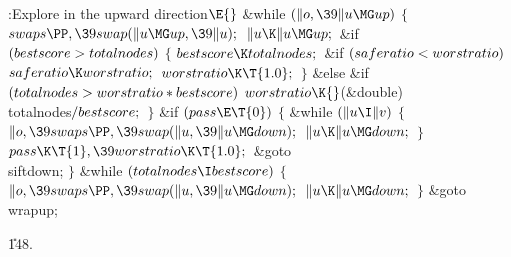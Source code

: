 \Y\B\4:Explore in the upward direction\X${}\E{}$\6
\&{while} ${}(\|o,\39\|u\MG\\{up}){}$\5
${}\{{}$\1\6
${}\\{swaps}\PP,\39\\{swap}(\|u\MG\\{up},\39\|u);{}$\6
${}\|u\K\|u\MG\\{up};{}$\6
\&{if} ${}(\\{bestscore}>\\{totalnodes}){}$\5
${}\{{}$\1\6
${}\\{bestscore}\K\\{totalnodes};{}$\6
\&{if} ${}(\\{saferatio}<\\{worstratio}){}$\1\5
${}\\{saferatio}\K\\{worstratio};{}$\2\6
${}\\{worstratio}\K\T{1.0};{}$\6
\4${}\}{}$\5
\2\&{else} \&{if} ${}(\\{totalnodes}>\\{worstratio}*\\{bestscore}){}$\1\5
${}\\{worstratio}\K{}$(\&{double}) \\{totalnodes}${}/\\{bestscore};{}$\2\6
\4${}\}{}$\2\6
\&{if} ${}(\\{pass}\E\T{0}){}$\5
${}\{{}$\1\6
\&{while} ${}(\|u\I\|v){}$\5
${}\{{}$\1\6
${}\|o,\39\\{swaps}\PP,\39\\{swap}(\|u,\39\|u\MG\\{down});{}$\6
${}\|u\K\|u\MG\\{down};{}$\6
\4${}\}{}$\2\6
${}\\{pass}\K\T{1},\39\\{worstratio}\K\T{1.0};{}$\6
\&{goto} \\{siftdown};\6
\4${}\}{}$\2\6
\&{while} ${}(\\{totalnodes}\I\\{bestscore}){}$\5
${}\{{}$\1\6
${}\|o,\39\\{swaps}\PP,\39\\{swap}(\|u,\39\|u\MG\\{down});{}$\6
${}\|u\K\|u\MG\\{down};{}$\6
\4${}\}{}$\2\6
\&{goto} \\{wrapup};\par
\U148.\fi

